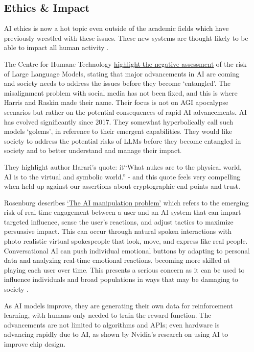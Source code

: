 \subsection{Ethics \& Impact}
AI ethics is now a hot topic even outside of the academic fields which have previously wrestled with these issues. These new systems are thought likely to be able to impact all human activity \cite{eloundou2023gpts}. \par
The Centre for Humane Technology \href{https://www.humanetech.com/key-issues}{highlight the negative assessment} of the risk of Large Language Models, stating that major advancements in AI are coming and society needs to address the issues before they become `entangled'. The misalignment problem with social media has not been fixed, and this is where Harris and Raskin made their name. Their focus is not on AGI apocalypse scenarios but rather on the potential consequences of rapid AI advancements. AI has evolved significantly since 2017. They somewhat hyperbolically call such models `golems', in reference to their emergent capabilities. They would like society to address the potential risks of LLMs before they become entangled in society and to better understand and manage their impact.\par
They highlight author \cite{harari2014sapiens} Harari's quote: it{``What nukes are to the physical world, AI is to the virtual and symbolic world.''} - and this quote feels very compelling when held up against our assertions about cryptographic end points and trust.\par
Rosenburg describes \href{https://bigthink.com/the-present/danger-conversational-ai/}{`The AI manipulation problem'} which refers to the emerging risk of real-time engagement between a user and an AI system that can impart targeted influence, sense the user's reactions, and adjust tactics to maximize persuasive impact. This can occur through natural spoken interactions with photo realistic virtual spokespeople that look, move, and express like real people. Conversational AI can push individual emotional buttons by adapting to personal data and analyzing real-time emotional reactions, becoming more skilled at playing each user over time. This presents a serious concern as it can be used to influence individuals and broad populations in ways that may be damaging to society \cite{Rosenberg2023}. \par
As AI models improve, they are generating their own data for reinforcement learning, with humans only needed to train the reward function. The advancements are not limited to algorithms and APIs; even hardware is advancing rapidly due to AI, as shown by Nvidia's research on using AI to improve chip design.\par
